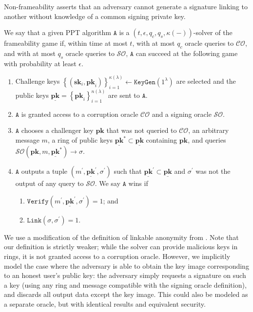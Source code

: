 \documentclass[draft]{llncs} %
\begin{document}
Non-frameability asserts that an adversary cannot generate a signature linking to another without knowledge of a common signing private key.

\begin{definition}
We say that a given PPT algorithm $\texttt{A}$ is a $(t, \epsilon, q_c, q_s, \kappa(-))$-solver of the frameability game if, within time at most $t$, with at most $q_c$ oracle queries to $\mathcal{CO}$, and with at most $q_s$ oracle queries to $\mathcal{SO}$, $\texttt{A}$ can succeed at the following game with probability at least $\epsilon$.
\begin{enumerate}
\item Challenge keys $\left\{(\textbf{sk}_i, \textbf{pk}_i)\right\}_{i=1}^{\kappa(\lambda)} \leftarrow \texttt{KeyGen}(1^\lambda)$ are selected and the public keys $\underline{\textbf{pk}} = \left\{\textbf{pk}_i\right\}_{i=1}^{n(\lambda)}$ are sent to $\texttt{A}$.

\item $\texttt{A}$ is granted access to a corruption oracle $\mathcal{CO}$ and a signing oracle $\mathcal{SO}$.

\item $\texttt{A}$ chooses a challenger key $\textbf{pk}$ that was not queried to $\mathcal{CO}$, an arbitrary message $m$, a ring of public keys $\underline{\textbf{pk}}^* \subset \underline{\textbf{pk}}$ containing $\textbf{pk}$, and queries $\mathcal{SO}(\textbf{pk},m,\underline{\textbf{pk}}^*) \to \sigma$.

\item $\texttt{A}$ outputs a tuple $(m^\prime, \underline{\textbf{pk}}^\prime, \sigma^\prime)$ such that $\underline{\textbf{pk}}^\prime \subset \underline{\textbf{pk}}$ and $\sigma^\prime$ was not the output of any query to $\mathcal{SO}$. We say $\texttt{A}$ wins if
\begin{enumerate}
\item $\texttt{Verify}(m^\prime, \underline{\textbf{pk}}^\prime, \sigma^\prime) = 1$; and
\item $\texttt{Link}(\sigma,\sigma^\prime) = 1$.
\end{enumerate}
\end{enumerate}
\end{definition}

We use a modification of the definition of linkable anonymity from \cite{backes2019ring}. Note that our definition is strictly weaker; while the solver can provide malicious keys in rings, it is not granted access to a corruption oracle. However, we implicitly model the case where the adversary is able to obtain the key image corresponding to an honest user's public key: the adversary simply requests a signature on such a key (using any ring and message compatible with the signing oracle definition), and discards all output data except the key image. This could also be modeled as a separate oracle, but with identical results and equivalent security.
\end{document}
